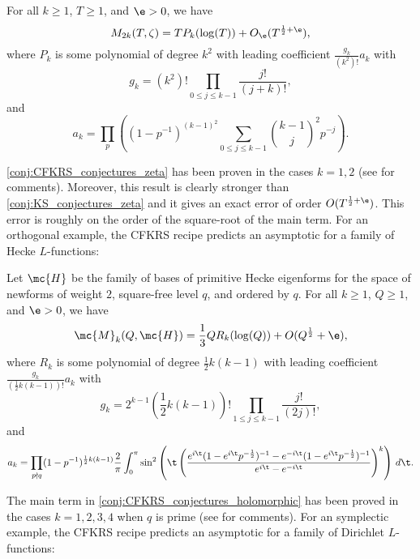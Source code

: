   \begin{conjecture}\label{conj:CFKRS_conjectures_zeta}
    For all $k \ge 1$, $T \ge 1$, and $\e > 0$, we have
    \[
      M_{2k}(T,\zeta) = TP_{k}(\log(T))+O_{\e}(T^{\frac{1}{2}+\e}),
    \]
    where $P_{k}$ is some polynomial of degree $k^{2}$ with leading coefficient $\frac{g_{k}}{(k^{2})!}a_{k}$ with
    \[
      g_{k} = (k^{2})!\prod_{0 \le j \le k-1}\frac{j!}{(j+k)!},
    \]
    and
    \[
      a_{k} = \prod_{p}\left((1-p^{-1})^{(k-1)^{2}}\sum_{0 \le j \le k-1}\binom{k-1}{j}^{2}p^{-j}\right).
    \]
  \end{conjecture}

  \cref{conj:CFKRS_conjectures_zeta} has been proven in the cases $k = 1,2$ (see \cite{conrey2005integral} for comments). Moreover, this result is clearly stronger than \cref{conj:KS_conjectures_zeta} and it gives an exact error of order $O(T^{\frac{1}{2}+\e})$. This error is roughly on the order of the square-root of the main term. For an orthogonal example, the CFKRS recipe predicts an asymptotic for a family of Hecke $L$-functions:

  \begin{conjecture}\label{conj:CFKRS_conjectures_holomorphic}
    Let $\mc{H}$ be the family of bases of primitive Hecke eigenforms for the space of newforms of weight $2$, square-free level $q$, and ordered by $q$. For all $k \ge 1$, $Q \ge 1$, and $\e > 0$, we have
    \[
      \mc{M}_{k}(Q,\mc{H}) = \frac{1}{3}QR_{k}(\log(Q))+O(Q^{\frac{1}{2}}+\e),
    \]
    where $R_{k}$ is some polynomial of degree $\frac{1}{2}k(k-1)$ with leading coefficient $\frac{g_{k}}{\left(\frac{1}{2}k(k-1)\right)!}a_{k}$ with
    \[
      g_{k} = 2^{k-1}\left(\frac{1}{2}k(k-1)\right)!\prod_{1 \le j \le k-1}\frac{j!}{(2j)!},
    \]
    and
    \[
      a_{k} = \prod_{p \nmid q}(1-p^{-1})^{\frac{1}{2}k(k-1)}\frac{2}{\pi}\int_{0}^{\pi}\sin^{2}\left(\t\left(\frac{e^{i\t}(1-e^{i\t}p^{-\frac{1}{2}})^{-1}-e^{-i\t}(1-e^{i\t}p^{-\frac{1}{2}})^{-1}}{e^{i\t}-e^{-i\t}}\right)^{k}\right)\,d\t.
    \]
  \end{conjecture}

  The main term in \cref{conj:CFKRS_conjectures_holomorphic} has been proved in the cases $k = 1,2,3,4$ when $q$ is prime (see \cite{conrey2005integral} for comments). For an symplectic example, the CFKRS recipe predicts an asymptotic for a family of Dirichlet $L$-functions:

